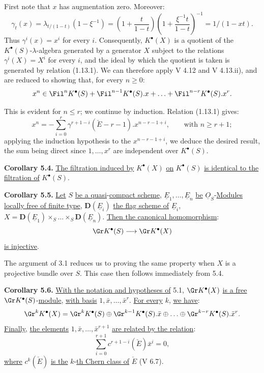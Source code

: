 First note that $x$ has augmentation zero. Moreover:
\[
  \gamma_t(x)=\lambda_{t/(1-t)}(1-\xi^{-1})
  =\left(1+\frac{t}{1-t}\right)\left(1+\frac{\xi^{-1}t}{1-t}\right)^{-1}
  =1/(1-xt) .
\]
Thus $\gamma^i(x)=x^i$ for every $i$. Consequently, $K^{\bullet}(X)$ is a quotient of the $K^{\bullet}(S)$-$\lambda$-algebra generated by a generator $X$ subject to the relations $\gamma^i(X)=X^i$ for every $i$, and the ideal by which the quotient is taken is generated by relation (1.13.1). We can therefore apply V 4.12 and V 4.13.ii), and are reduced to showing that, for every $n\ge 0$:
\[
  x^n\in \Fil^nK^{\bullet}(S)+\Fil^{n-1}K^{\bullet}(S).x+\ldots+\Fil^{n-r}K^{\bullet}(S).x^r .
\]

This is evident for $n\le r$; we continue by induction. Relation (1.13.1) gives:
\[
  x^n=-\sum_{i=0}^{r}\gamma^{r+1-i}(\check E-r-1).x^{n-r-1+i},\qquad \text{with } n\ge r+1;
\]
applying the induction hypothesis to the $x^{n-r-1+i}$, we deduce the desired result, the sum being direct since $1,\ldots,x^r$ are independent over $K^{\bullet}(S)$.

%
\textbf{Corollary 5.4.} \uline{The filtration induced by} $K^{\bullet}(X)$ \uline{on} $K^{\bullet}(S)$ \uline{is identical to the filtration of} $K^{\bullet}(S)$.

\textbf{Corollary 5.5.} \uline{Let} $S$ \uline{be a quasi}-\uline{compact scheme}, $\underline{E}_1,\ldots,\underline{E}_n$ \uline{be} $\underline{O}_S$-\uline{Modules} \uline{locally free of finite type}, $\mathbf D(\underline{E}_i)$ \uline{the flag scheme of} $\underline{E}_i$, $X=\mathbf D(\underline{E}_1)\times_S\ldots\times_S \mathbf D(\underline{E}_n)$. \uline{Then the canonical homomorphism}:
\[
  \Gr K^{\bullet}(S)\longrightarrow \Gr K^{\bullet}(X)
\]
\uline{is injective}.

The argument of 3.1 reduces us to proving the same property when $X$ is a projective bundle over $S$. This case then follows immediately from 5.4.

\textbf{Corollary 5.6.} \uline{With the notation and hypotheses of} 5.1, $\Gr K^{\bullet}(X)$ \uline{is a free} $\Gr K^{\bullet}(S)$-\uline{module}, \uline{with basis} $1,\bar x,\ldots,\bar x^r$. \uline{For every} $k$, \uline{we have}:
\[
  \Gr^kK^{\bullet}(X)=\Gr^kK^{\bullet}(S)\oplus \Gr^{k-1}K^{\bullet}(S).\bar x\oplus\ldots\oplus \Gr^{k-r}K^{\bullet}(S).\bar x^r .
\]
\uline{Finally}, \uline{the elements} $1,\bar x,\ldots,\bar x^{r+1}$ \uline{are related by the relation}:
\[
  \sum_{i=0}^{r+1}c^{r+1-i}(\check E)\bar x^i=0,
\]
\uline{where} $c^k(\check E)$ \uline{is the} $k$-\uline{th Chern class of} $\check E$ (V 6.7).

